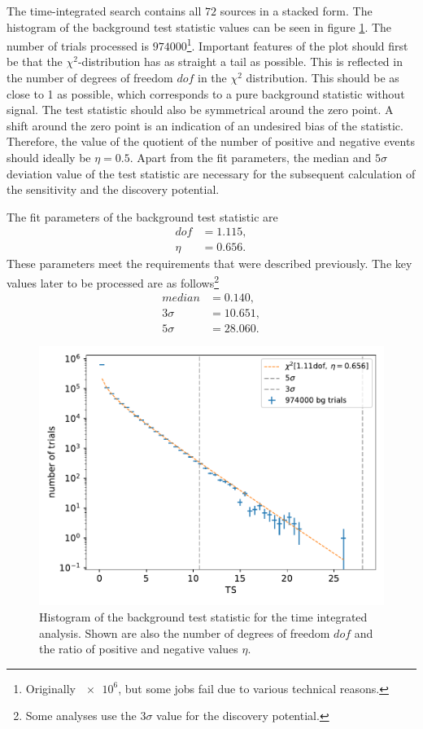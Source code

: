 The time-integrated search contains all $\num{72}$ sources in a stacked form.
The histogram of the background test statistic values can be seen in figure \ref{fig:bg_ts_time_int}.
The number of trials processed is $\num{974000}$\footnote{Originally $\num{e6}$, but some jobs fail due to various technical reasons.}.
Important features of the plot should first be that the $\chi^2$-distribution has as straight a tail as possible.
This is reflected in the number of degrees of freedom $dof$ in the $\chi^2$ distribution.
This should be as close to 1 as possible, which corresponds to a pure background statistic without signal.
The test statistic should also be symmetrical around the zero point.
A shift around the zero point is an indication of an undesired bias of the statistic.
Therefore, the value of the quotient of the number of positive and negative events should ideally be $\eta = \num{0.5}$.
Apart from the fit parameters, the median and $5\sigma$ deviation value of the test statistic are necessary for the subsequent calculation of the sensitivity and the discovery potential.

The fit parameters of the background test statistic are
\begin{align}
  dof &= \num{1.115},\\
  \eta &= \num{0.656}.
\end{align}
These parameters meet the requirements that were described previously.
The key values later to be processed are as follows\footnote{Some analyses use the $3\sigma$ value for the discovery potential.}
\begin{align}
  median &= \num{0.140},\\
  3\sigma &= \num{10.651},\\
  5\sigma &= \num{28.060}.
\end{align}
\begin{figure}
    \centering
    \includegraphics[width=\linewidth]{Plots/05_csky/9_years_gfu_gold_bg_new.pdf}
    \caption{Histogram of the background test statistic for the time integrated analysis. Shown are also the number of degrees of freedom $dof$ and the ratio of positive and negative values $\eta$.}
    \label{fig:bg_ts_time_int}
\end{figure}

